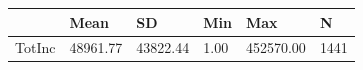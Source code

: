 \begin{tabular}{llllll}
\hline
& Mean & SD & Min & Max & N \\ \hline
TotInc & \num{48961.77} & \num{43822.44} & \num{1.00} & \num{452570.00} & 1441 \\
\hline
\end{tabular}
